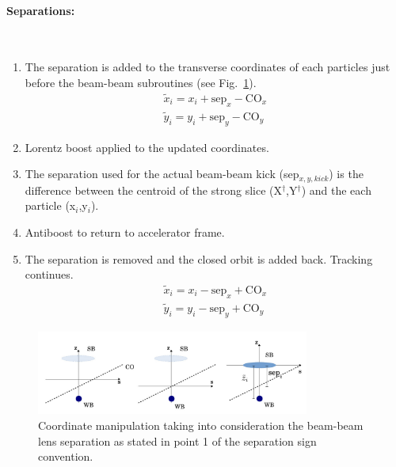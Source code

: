 \paragraph{Separations:}~\\
\begin{enumerate}
    \item The separation is added to the transverse coordinates of each particles just before the beam-beam subroutines (see Fig.~\ref{fig:BB_sep}).
        \begin{eqnarray*}
            \tilde x_{i} = x_{i} + \mathrm{sep}_{x} - \mathrm{CO}_{x} \\
            \tilde y_{i} = y_{i} + \mathrm{sep}_{y} - \mathrm{CO}_{y} 
        \end{eqnarray*}
    \item Lorentz boost applied to the updated coordinates.
    \item The separation used for the actual beam-beam kick (sep$_{x,y,kick}$) is the difference between the centroid of the strong slice (X$^{\dag}$,Y$^{\dag}$) and the each particle (x$_i$,y$_i$).
    \item Antiboost to return to accelerator frame.
    \item The separation is removed and the closed orbit is added back. Tracking continues.
        \begin{eqnarray*}
            \tilde x_{i} = x_{i} - \mathrm{sep}_{x} + \mathrm{CO}_{x} \\
            \tilde y_{i} = y_{i} - \mathrm{sep}_{y} + \mathrm{CO}_{y}
        \end{eqnarray*}
\end{enumerate}
\begin{figure}[h]
    \begin{center}
    \includegraphics[width=0.8\textwidth]{figures/BB_sep}
    \caption{Coordinate manipulation taking into consideration the beam-beam lens separation as stated in point 1 of the separation sign convention.}
    \label{fig:BB_sep}
    \end{center}
\end{figure}

